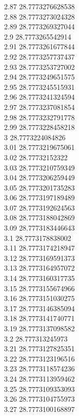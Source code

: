 {2.87	28.7773276628538\\
2.88	28.7773273024328\\
2.89	28.7773269327044\\
2.9	28.7773265542914\\
2.91	28.7773261677844\\
2.92	28.7773257737437\\
2.93	28.7773253727002\\
2.94	28.7773249651575\\
2.95	28.7773245515931\\
2.96	28.7773241324594\\
2.97	28.7773237081854\\
2.98	28.7773232791778\\
2.99	28.7773228458218\\
3	28.7773224084826\\
3.01	28.7773219675061\\
3.02	28.77732152322\\
3.03	28.7773210759349\\
3.04	28.7773206259449\\
3.05	28.7773201735283\\
3.06	28.7773197189489\\
3.07	28.7773192624563\\
3.08	28.7773188042869\\
3.09	28.7773183446643\\
3.1	28.7773178838002\\
3.11	28.7773174218947\\
3.12	28.7773169591373\\
3.13	28.7773164957072\\
3.14	28.7773160317735\\
3.15	28.7773155674966\\
3.16	28.7773151030275\\
3.17	28.7773146385094\\
3.18	28.7773141740771\\
3.19	28.7773137098582\\
3.2	28.777313245973\\
3.21	28.7773127825351\\
3.22	28.7773123196516\\
3.23	28.7773118574236\\
3.24	28.7773113959462\\
3.25	28.7773109353093\\
3.26	28.7773104755973\\
3.27	28.7773100168897\\
}
